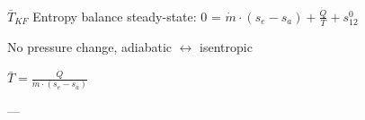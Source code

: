 \( \bar{T}_{KF} \)  
Entropy balance steady-state:  
0 = \( \dot{m} \cdot (s_{e} - s_{a}) + \frac{\dot{Q}}{T} + s^0_{12} \)  

No pressure change, adiabatic \( \leftrightarrow \) isentropic  

\( \bar{T} = \frac{\dot{Q}}{\dot{m} \cdot (s_{e} - s_{a})} \)  

---